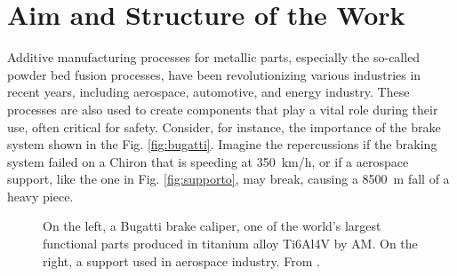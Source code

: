 \section{Aim and Structure of the Work}
\label{sec:aimwork}
Additive manufacturing processes for metallic parts, especially the so-called powder bed fusion processes, have been revolutionizing various industries in recent years, including aerospace, automotive, and energy industry. These processes are also used to create components that play a vital role during their use, often critical for safety. Consider, for instance, the importance of the brake system shown in the Fig. \ref{fig:bugatti}. Imagine the repercussions if the braking system failed on a Chiron that is speeding at \SI{350}{\kilo\metre /\hour}, or if a aerospace support, like the one in Fig. \ref{fig:supporto}, may break, causing a \SI{8500}{\metre} fall of a heavy piece. 
\begin{figure}
    \centering
    \quad
    \caption[Functional AM part printed in metal.]{On the left, a Bugatti brake caliper, one of the world’s largest functional parts produced in titanium alloy Ti6Al4V by AM. On the right, a support used in aerospace industry. From \citeauthor{du_plessis_beautiful_2019}.}
    \label{fig:funcpart}
\end{figure}
